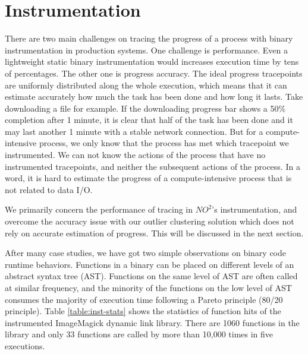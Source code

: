 \section{Instrumentation} \label{sec-instrument}

There are two main challenges on tracing the progress of a process with binary instrumentation
in production systems. One challenge is performance. Even a lightweight static binary
instrumentation would increases execution time by tens of percentages. The other one is
progress accuracy. The ideal progress tracepoints are uniformly distributed along the whole execution, which
means that it can estimate accurately how much the task has been done and how long it
lasts. Take downloading a file for example. If the downloading progress bar shows a
50\% completion after 1 minute, it is clear that half of the task has been done and it may
last another 1 minute with a stable network connection. But for a compute-intensive
process, we only know that the process has met which tracepoint we instrumented. We can
not know the actions of the process that have no instrumented tracepoints, and neither the subsequent actions of the process. In a word, it is hard to estimate the progress of a compute-intensive
process that is not related to data I/O.

We primarily concern the performance of tracing in $NO^2$'s instrumentation, and 
overcome the accuracy issue with our outlier clustering solution which does not rely on
accurate estimation of progress. This will be discussed in the next section.

After many case studies, we have got two simple observations on binary code runtime
behaviors. Functions in a binary can be placed on different levels of an abstract syntax
tree (AST). Functions on the same level of AST are often called at similar frequency, and
the minority of the functions on the low level of AST consumes the majority of execution time
following a Pareto principle (80/20 principle). Table \ref{table:inst-stats} shows
the statistics of function hits of the instrumented ImageMagick dynamic link library.
There are 1060 functions in the library and only 33 functions are called by more than 10,000
times in five executions.

